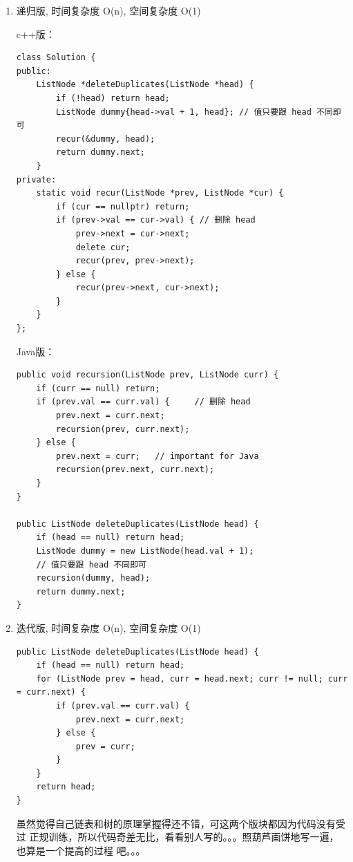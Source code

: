 \documentclass[12pt]{book}
\begin{document}
\begin{enumerate}
\item 递归版, 时间复杂度 O(n), 空间复杂度 O(1)
\label{sec-3-2-4-1}

c++版： 
\lstset{language=java,label= ,caption= ,numbers=none}
\begin{lstlisting}
class Solution {
public:
    ListNode *deleteDuplicates(ListNode *head) {
        if (!head) return head;
        ListNode dummy{head->val + 1, head}; // 值只要跟 head 不同即可
        recur(&dummy, head);
        return dummy.next;
    }
private:
    static void recur(ListNode *prev, ListNode *cur) {
        if (cur == nullptr) return;
        if (prev->val == cur->val) { // 删除 head
            prev->next = cur->next;
            delete cur;
            recur(prev, prev->next);
        } else {
            recur(prev->next, cur->next);
        }
    }
};
\end{lstlisting}

Java版：
\lstset{language=java,label= ,caption= ,numbers=none}
\begin{lstlisting}
public void recursion(ListNode prev, ListNode curr) {
    if (curr == null) return;
    if (prev.val == curr.val) {     // 删除 head
        prev.next = curr.next;
        recursion(prev, curr.next);
    } else {
        prev.next = curr;   // important for Java
        recursion(prev.next, curr.next);
    }
}
        
public ListNode deleteDuplicates(ListNode head) {
    if (head == null) return head;
    ListNode dummy = new ListNode(head.val + 1);
    // 值只要跟 head 不同即可
    recursion(dummy, head);
    return dummy.next;
}
\end{lstlisting}

\item 迭代版, 时间复杂度 O(n), 空间复杂度 O(1)
\label{sec-3-2-4-2}

\lstset{language=java,label= ,caption= ,numbers=none}
\begin{lstlisting}
public ListNode deleteDuplicates(ListNode head) {
    if (head == null) return head;
    for (ListNode prev = head, curr = head.next; curr != null; curr = curr.next) {
        if (prev.val == curr.val) {
            prev.next = curr.next;
        } else {
            prev = curr;
        }
    }
    return head;
}
\end{lstlisting}

虽然觉得自己链表和树的原理掌握得还不错，可这两个版块都因为代码没有受过
正规训练，所以代码奇差无比，看看别人写的。。。照葫芦画饼地写一遍，也算是一个提高的过程
吧。。。
\end{enumerate}
\end{document}
